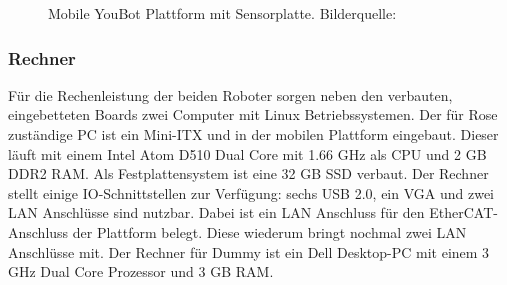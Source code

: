  \begin{figure}[H]
 	\centering
 	\caption{Mobile YouBot Plattform mit Sensorplatte. Bilderquelle: \cite{kuka2015}}
 	\label{fig:basic-aufbau-youbot-base-full}
 \end{figure}

\subsubsection{Rechner}
Für die Rechenleistung der beiden Roboter sorgen neben den verbauten, eingebetteten Boards zwei Computer mit Linux Betriebssystemen.
Der für Rose zuständige PC ist ein Mini-ITX und in der mobilen Plattform eingebaut. Dieser läuft mit einem Intel Atom D510 Dual Core mit 1.66 GHz als CPU und 2 GB DDR2 RAM. Als Festplattensystem ist eine 32 GB SSD verbaut. Der Rechner stellt einige IO-Schnittstellen zur Verfügung: sechs USB 2.0, ein VGA und zwei LAN Anschlüsse sind nutzbar. Dabei ist ein LAN Anschluss für den EtherCAT-Anschluss der Plattform belegt. Diese wiederum bringt nochmal zwei LAN Anschlüsse mit. Der Rechner für Dummy ist ein Dell Desktop-PC mit einem 3 GHz Dual Core Prozessor und 3 GB RAM. 

